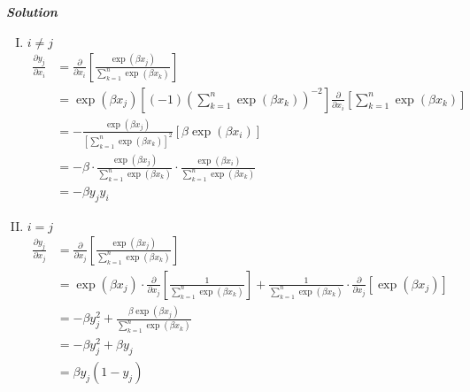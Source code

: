 \documentclass{article}
\begin{document}
\textbf{\emph{Solution}}
\begin{enumerate}[I.]
    \item $i \neq j$
    \begin{align*}
        \frac{\partial y_j}{\partial x_i} &= \frac{\partial}{\partial x_i}\left[\frac{\exp(\beta x_j)}{\sum_{k=1}^n \exp(\beta x_k)}\right] \\
        &= \exp(\beta x_j)\left[(-1)\left(\sum_{k=1}^n \exp(\beta x_k)\right)^{-2}\right] \frac{\partial}{\partial x_i}\left[\sum_{k=1}^n \exp(\beta x_k)\right] \\
        &= - \frac{\exp(\beta x_j)}{\left[\sum_{k=1}^n \exp(\beta x_k)\right]^{2}} \left[ \beta \exp(\beta x_i) \right] \\
        &= -\beta \cdot \frac{\exp(\beta x_j)}{\sum_{k=1}^n \exp(\beta x_k)} \cdot \frac{\exp(\beta x_i)}{\sum_{k=1}^n \exp(\beta x_k)} \\
        &= -\beta y_j y_i
    \end{align*}
    \item $i = j$
    \begin{align*}
        \frac{\partial y_j}{\partial x_j} &= \frac{\partial}{\partial x_j}\left[\frac{\exp(\beta x_j)}{\sum_{k=1}^n \exp(\beta x_k)}\right] \\
        &= \exp(\beta x_j) \cdot \frac{\partial}{\partial x_j}\left[\frac{1}{\sum_{k=1}^n \exp(\beta x_k)}\right] + \frac{1}{\sum_{k=1}^n \exp(\beta x_k)} \cdot \frac{\partial}{\partial x_j}\left[\exp(\beta x_j)\right] \\
        &= -\beta y_j^2 + \frac{\beta \exp(\beta x_j)}{\sum_{k=1}^n \exp(\beta x_k)} \\
        &= -\beta y_j^2 + \beta y_j \\
        &= \beta y_j (1 - y_j)
    \end{align*}
\end{enumerate}
\end{document}
